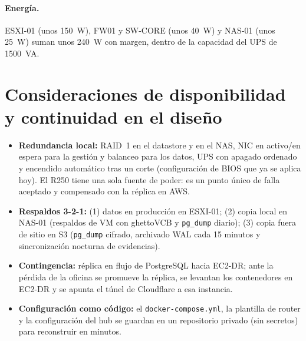 \paragraph{Energía.} ESXI-01 (unos 150~W), FW01 y SW-CORE (unos 40~W) y NAS-01 (unos
25~W) suman unos 240~W con margen, dentro de la capacidad del UPS de 1500~VA.

\section{Consideraciones de disponibilidad y continuidad en el diseño}

\begin{itemize}
  \item \textbf{Redundancia local:} RAID~1 en el datastore y en el NAS, NIC en
  activo/en espera para la gestión y balanceo para los datos, UPS con apagado ordenado
  y encendido automático tras un corte (configuración de BIOS que ya se aplica hoy).
  El R250 tiene una sola fuente de poder: es un punto único de falla aceptado y
  compensado con la réplica en AWS.
  \item \textbf{Respaldos 3-2-1:} (1) datos en producción en ESXI-01; (2) copia local
  en NAS-01 (respaldos de VM con ghettoVCB y \texttt{pg\_dump} diario); (3) copia fuera
  de sitio en S3 (\texttt{pg\_dump} cifrado, archivado WAL cada 15 minutos y
  sincronización nocturna de evidencias).
  \item \textbf{Contingencia:} réplica en flujo de PostgreSQL hacia EC2-DR; ante la
  pérdida de la oficina se promueve la réplica, se levantan los contenedores en
  EC2-DR y se apunta el túnel de Cloudflare a esa instancia.
  \item \textbf{Configuración como código:} el \texttt{docker-compose.yml}, la plantilla
  de router y la configuración del hub se guardan en un repositorio privado (sin
  secretos) para reconstruir en minutos.
\end{itemize}

